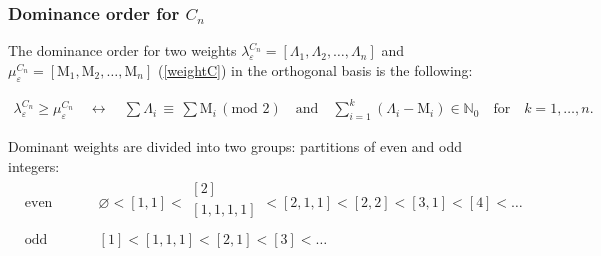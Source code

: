 \documentclass{article}
\def\ve{\varepsilon}
\begin{document}
\subsubsection{Dominance order for $C_n$}

The dominance order for two weights $ \lambda^{C_n}_{\ve} = [\Lambda_1, \Lambda_2, \dots,\Lambda_n] $ and $\mu^{C_n}_{\ve} =[\text{M}_1, \text{M}_2, \dots, \text{M}_n] $ (\ref{weightC}) in the orthogonal basis is the following:

\begin{align}
    \lambda^{C_n}_{\ve} \geq \mu^{C_n}_{\ve} \quad \longleftrightarrow \quad \sum \Lambda_i\,\equiv\, \sum \text{M}_i \,(\text{mod }2) \quad \text{and} \quad \sum_{i=1}^{k}(\Lambda_i - \text{M}_i) \in \mathbb{N}_0 \quad\text{for}\quad k=1,\dots,n.
\end{align}

Dominant weights are divided into two groups: partitions of even and odd integers:
\begin{equation}
    \begin{aligned}
     & \text{even integers:}
      & &  \varnothing < [1,1]<
        \begin{array}{c}
           [2] \\[0.2pt]
           [1,1,1,1] \\
      \end{array} <
      [2,1,1]<[2,2]<[3,1]<[4]< \dots\\
       & \text{odd integers:}
      & &  [1] < [1,1,1] < [2,1] < [3] < \dots
    \end{aligned}
\end{equation}
\end{document}
